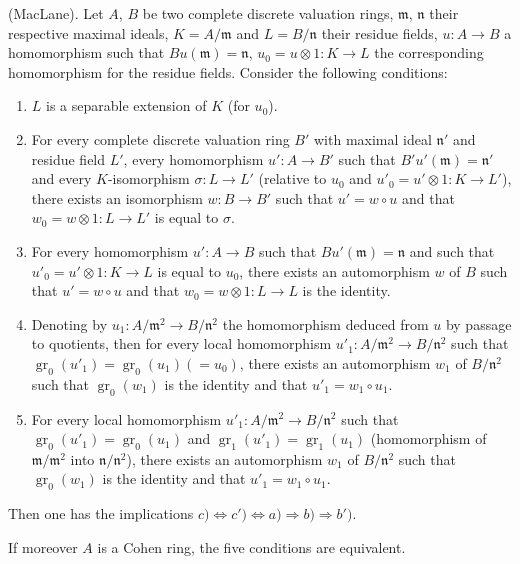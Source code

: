 \begin{proposition}[21.5.2]
\label{0.21.5.2}
\textnormal{(MacLane).}
Let $A$, $B$ be two complete discrete valuation rings, $\mathfrak{m}$, $\mathfrak{n}$ their respective maximal ideals, $K=A/\mathfrak{m}$ and $L=B/\mathfrak{n}$ their residue fields, $u:A\to B$ a homomorphism such that $Bu(\mathfrak{m})=\mathfrak{n}$, $u_0=u\otimes 1:K\to L$ the corresponding homomorphism for the residue fields.
Consider the following conditions:
\begin{enumerate}
  \item[\rm a)] $L$ is a separable extension of $K$ \textup{(}for $u_0$\textup{)}.
  \item[\rm b)] For every complete discrete valuation ring $B'$ with maximal ideal $\mathfrak{n}'$ and residue field $L'$,
    every homomorphism $u':A\to B'$ such that $B'u'(\mathfrak{m})=\mathfrak{n}'$ and every $K$-isomorphism $\sigma:L\to L'$ \textup{(}relative to $u_0$ and $u'_0=u'\otimes 1:K\to L'$\textup{)}, there exists an isomorphism $w:B\to B'$ such that $u'=w\circ u$ and that $w_0=w\otimes 1:L\to L'$ is equal to $\sigma$.
  \item[\rm b$'$)] For every homomorphism $u':A\to B$ such that $Bu'(\mathfrak{m})=\mathfrak{n}$ and such that $u'_0=u'\otimes 1:K\to L$ is equal to $u_0$, there exists an automorphism $w$ of $B$ such that $u'=w\circ u$ and that $w_0=w\otimes 1:L\to L$ is the identity.
  \item[\rm c)] Denoting by $u_1:A/\mathfrak{m}^2\to B/\mathfrak{n}^2$ the homomorphism deduced from $u$ by passage to quotients, then for every local homomorphism $u'_1:A/\mathfrak{m}^2\to B/\mathfrak{n}^2$ such that $\operatorname{gr}_0(u'_1)=\operatorname{gr}_0(u_1)(=u_0)$, there exists an automorphism $w_1$ of $B/\mathfrak{n}^2$ such that $\operatorname{gr}_0(w_1)$ is the identity and that $u'_1=w_1\circ u_1$.
  \item[\rm c$'$)] For every local homomorphism $u'_1:A/\mathfrak{m}^2\to B/\mathfrak{n}^2$ such that $\operatorname{gr}_0(u'_1)=\operatorname{gr}_0(u_1)$ and $\operatorname{gr}_1(u'_1)=\operatorname{gr}_1(u_1)$ \textup{(}homomorphism of $\mathfrak{m}/\mathfrak{m}^2$ into $\mathfrak{n}/\mathfrak{n}^2$\textup{)}, there exists an automorphism $w_1$ of $B/\mathfrak{n}^2$ such that $\operatorname{gr}_0(w_1)$ is the identity and that $u'_1=w_1\circ u_1$.
\end{enumerate}
Then one has the implications $c)\Leftrightarrow c')\Leftrightarrow a)\Rightarrow b)\Rightarrow b')$.

If moreover $A$ is a Cohen ring, the five conditions are equivalent.
\end{proposition}

